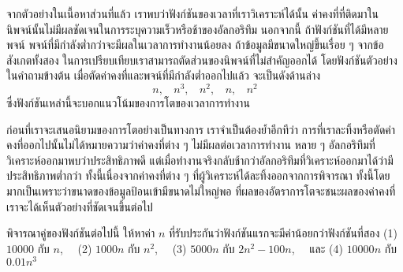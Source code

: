 จาก{\wbr}ตัวอย่าง{\wbr}ใน{\wbr}เนื้อหา{\wbr}ส่วน{\wbr}ที่แล้ว เรา{\wbr}พบ{\wbr}ว่า{\wbr}ฟังก์ชัน{\wbr}ของ{\wbr}เวลา{\wbr}ที่{\wbr}เรา{\wbr}วิเคราะห์{\wbr}ได้{\wbr}นั้น{\wbr}
ค่าคงที่{\wbr}ที่{\wbr}ติด{\wbr}มา{\wbr}ใน{\wbr}นิพจน์{\wbr}นั้น{\wbr}ไม่{\wbr}มี{\wbr}ผล{\wbr}ชัดเจน{\wbr}ใน{\wbr}การ{\wbr}ระบุ{\wbr}ความ{\wbr}เร็ว{\wbr}หรือ{\wbr}ช้า{\wbr}ของ{\wbr}อัล{\wbr}กอ{\wbr}ริ{\wbr}ทึม นอกจากนี้{\wbr}
ถ้า{\wbr}ฟังก์ชัน{\wbr}ที่{\wbr}ได้{\wbr}มี{\wbr}หลาย{\wbr}พจน์ พจน์{\wbr}ที่{\wbr}มี{\wbr}กำลัง{\wbr}ต่ำ{\wbr}กว่า{\wbr}จะ{\wbr}มี{\wbr}ผล{\wbr}ใน{\wbr}เวลา{\wbr}การ{\wbr}ทำงาน{\wbr}น้อย{\wbr}ลง{\wbr}
ถ้า{\wbr}ข้อมูล{\wbr}มี{\wbr}ขนาด{\wbr}ใหญ่{\wbr}ขึ้น{\wbr}เรื่อย ๆ จาก{\wbr}ข้อสังเกต{\wbr}ทั้ง{\wbr}สอง{\wbr}
ใน{\wbr}การ{\wbr}เปรียบเทียบ{\wbr}เรา{\wbr}สามารถ{\wbr}ตัด{\wbr}ส่วน{\wbr}ของ{\wbr}นิพจน์{\wbr}ที่{\wbr}ไม่{\wbr}สำคัญ{\wbr}ออก{\wbr}ได้{\wbr}
โดย{\wbr}ฟังก์ชัน{\wbr}ตัวอย่าง{\wbr}ใน{\wbr}คำถาม{\wbr}ข้างต้น เมื่อ{\wbr}ตัด{\wbr}ค่าคงที่{\wbr}และ{\wbr}พจน์{\wbr}ที่{\wbr}มี{\wbr}กำลัง{\wbr}ต่ำ{\wbr}ออก{\wbr}ไป{\wbr}แล้ว{\wbr}
จะ{\wbr}เป็น{\wbr}ดัง{\wbr}ด้าน{\wbr}ล่าง{\wbr}
\[
n, \ \ \ \ n^3, \ \ \ \ n^2, \ \ \ \ n, \ \ \ \ n^2
\]
ซึ่ง{\wbr}ฟังก์ชัน{\wbr}เหล่านี้{\wbr}จะ{\wbr}บอก{\wbr}แนวโน้ม{\wbr}ของ{\wbr}การ{\wbr}โต{\wbr}ของ{\wbr}เวลา{\wbr}การ{\wbr}ทำงาน{\wbr}

ก่อน{\wbr}ที่{\wbr}เรา{\wbr}จะ{\wbr}เสนอ{\wbr}นิยาม{\wbr}ของ{\wbr}การ{\wbr}โต{\wbr}อย่าง{\wbr}เป็นทางการ เรา{\wbr}จำเป็น{\wbr}ต้อง{\wbr}ย้ำ{\wbr}อีก{\wbr}ที{\wbr}ว่า{\wbr}
การ{\wbr}ที่{\wbr}เรา{\wbr}ละทิ้ง{\wbr}หรือ{\wbr}ตัด{\wbr}ค่าคงที่{\wbr}ออก{\wbr}ไป{\wbr}นั้น{\wbr}ไม่{\wbr}ได้{\wbr}หมายความ{\wbr}ว่า{\wbr}ค่าคงที่{\wbr}ต่าง ๆ
ไม่{\wbr}มี{\wbr}ผล{\wbr}ต่อ{\wbr}เวลา{\wbr}การ{\wbr}ทำงาน หลาย ๆ อัล{\wbr}กอ{\wbr}ริ{\wbr}ทึม{\wbr}ที่{\wbr}วิเคราะห์{\wbr}ออก{\wbr}มา{\wbr}พบ{\wbr}ว่า{\wbr}ประสิทธิภาพ{\wbr}ดี{\wbr}
แต่{\wbr}เมื่อ{\wbr}ทำงาน{\wbr}จริง{\wbr}กลับ{\wbr}ช้า{\wbr}กว่า{\wbr}อัล{\wbr}กอ{\wbr}ริ{\wbr}ทึม{\wbr}ที่{\wbr}วิเคราะห์{\wbr}ออก{\wbr}มา{\wbr}ได้{\wbr}ว่า{\wbr}มี{\wbr}ประสิทธิภาพ{\wbr}ต่ำ{\wbr}กว่า{\wbr}
ทั้งนี้{\wbr}เนื่องจาก{\wbr}ค่าคงที่{\wbr}ต่าง ๆ ที่{\wbr}ผู้{\wbr}วิเคราะห์{\wbr}ได้{\wbr}ละทิ้ง{\wbr}ออก{\wbr}จาก{\wbr}การ{\wbr}พิจารณา{\wbr}
ทั้งนี้{\wbr}โดยมาก{\wbr}เป็น{\wbr}เพราะว่า{\wbr}ขนาด{\wbr}ของ{\wbr}ข้อมูล{\wbr}ป้อน{\wbr}เข้า{\wbr}มี{\wbr}ขนาด{\wbr}ไม่{\wbr}ใหญ่{\wbr}พอ{\wbr}
ที่{\wbr}ผล{\wbr}ของ{\wbr}อัตรา{\wbr}การ{\wbr}โต{\wbr}จะ{\wbr}ชนะ{\wbr}ผล{\wbr}ของ{\wbr}ค่าคงที่ เรา{\wbr}จะ{\wbr}ได้{\wbr}เห็น{\wbr}ตัวอย่าง{\wbr}ที่{\wbr}ชัดเจน{\wbr}ขึ้น{\wbr}ต่อไป{\wbr}

\begin{quiz}{}
พิจารณา{\wbr}คู่{\wbr}ของ{\wbr}ฟังก์ชัน{\wbr}ต่อไปนี้ ให้{\wbr}หา{\wbr}ค่า $n$ ที่{\wbr}รับประกัน{\wbr}ว่า{\wbr}ฟังก์ชัน{\wbr}แรก{\wbr}จะ{\wbr}มี{\wbr}ค่า{\wbr}น้อย{\wbr}กว่า{\wbr}ฟังก์ชัน{\wbr}ที่{\wbr}สอง{\wbr}
(1) $10000$ กับ $n$, \ \ (2) $1000n$ กับ $n^2$, \ \ (3) $5000n$ กับ $2n^2 -
100n$, \ \ และ (4) $10000n$ กับ $0.01n^3$
\end{quiz}

